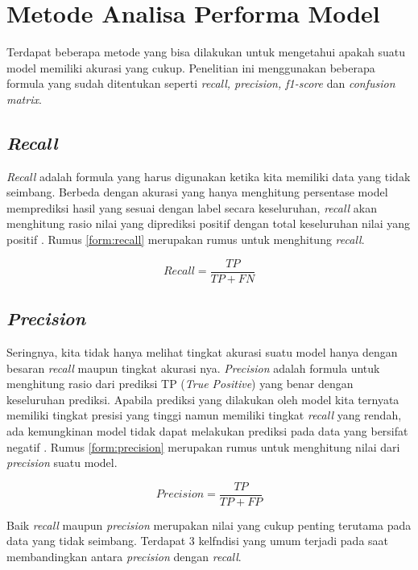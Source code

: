 \section{Metode Analisa Performa Model}
Terdapat beberapa metode yang bisa dilakukan untuk mengetahui apakah suatu model memiliki akurasi yang cukup. 
Penelitian ini menggunakan beberapa formula yang sudah ditentukan seperti \textit{recall, precision, f1-score} 
dan \textit{confusion matrix}.

\subsection{\textit{Recall}}
\textit{Recall} adalah formula yang harus digunakan ketika kita memiliki data yang tidak seimbang. Berbeda 
dengan akurasi yang hanya menghitung persentase model memprediksi hasil yang sesuai dengan label secara 
keseluruhan, \textit{recall} akan menghitung rasio nilai yang diprediksi positif dengan total keseluruhan 
nilai yang positif \cite{metrics_ml}. Rumus \ref{form:recall} merupakan rumus untuk menghitung \textit{recall}.

\begin{equation}
    Recall = \frac{TP}{TP+FN}
    \label{form:recall}
\end{equation}

\subsection{\textit{Precision}}
Seringnya, kita tidak hanya melihat tingkat akurasi suatu model hanya dengan besaran \textit{recall} maupun 
tingkat akurasi nya. \textit{Precision} adalah formula untuk menghitung rasio dari prediksi TP (\textit{True 
Positive}) yang benar dengan keseluruhan prediksi. Apabila prediksi yang dilakukan oleh model kita ternyata 
memiliki tingkat presisi yang tinggi namun memiliki tingkat \textit{recall} yang rendah, ada kemungkinan model 
tidak dapat melakukan prediksi pada data yang bersifat negatif \cite{metrics_ml}. Rumus \ref{form:precision} 
merupakan rumus untuk menghitung nilai dari \textit{precision} suatu model.

\begin{equation}
    Precision = \frac{TP}{TP+FP}
    \label{form:precision}
\end{equation}

Baik \textit{recall} maupun \textit{precision} merupakan nilai yang cukup penting terutama pada data yang tidak 
seimbang. Terdapat 3 kelfndisi yang umum terjadi pada saat membandingkan antara \textit{precision} dengan 
\textit{recall}.

